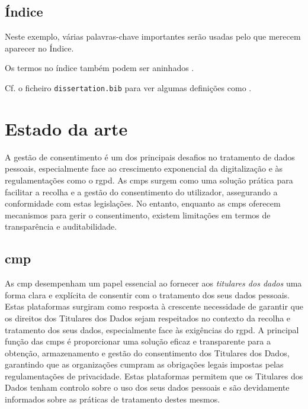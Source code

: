 \section{Índice}

Neste exemplo, várias palavras-chave importantes serão usadas pelo que merecem aparecer no Índice.

Os termos no índice também podem ser aninhados .

Cf. o ficheiro \texttt{dissertation.bib} para ver algumas definições como .


\chapter{Estado da arte}

A gestão de consentimento é um dos principais desafios no tratamento de dados pessoais, especialmente face ao crescimento exponencial da digitalização e às regulamentações como o \acrshort{rgpd}. As \acrshort{cmp}s surgem como uma solução prática para facilitar a recolha e a gestão do consentimento do utilizador, assegurando a conformidade com estas legislações. No entanto, enquanto as \acrshort{cmp}s oferecem mecanismos para gerir o consentimento, existem limitações em termos de transparência e auditabilidade.


\section{\acrfull{cmp}}

As \acrfull{cmp} desempenham um papel essencial ao fornecer aos \textit{titulares dos dados} uma forma clara e explícita de consentir com o tratamento dos seus dados pessoais. Estas plataformas surgiram como resposta à crescente necessidade de garantir que os direitos dos Titulares dos Dados sejam respeitados no contexto da recolha e tratamento dos seus dados, especialmente face às exigências do \acrshort{rgpd}. A principal função das \acrshort{cmp}s é proporcionar uma solução eficaz e transparente para a obtenção, armazenamento e gestão do consentimento dos Titulares dos Dados, garantindo que as organizações cumpram as obrigações legais impostas pelas regulamentações de privacidade. Estas plataformas permitem que os Titulares dos Dados tenham controlo sobre o uso dos seus dados pessoais e são devidamente informados sobre as práticas de tratamento destes mesmos.

